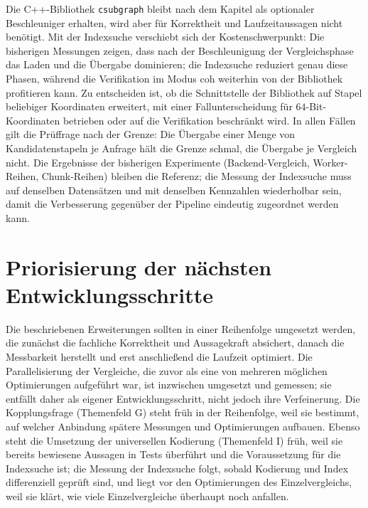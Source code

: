 \documentclass[a4paper,12pt, twoside]{report}
\theoremstyle{definition}
\begin{document}
Die C++-Bibliothek \texttt{csubgraph} bleibt nach dem Kapitel als optionaler Beschleuniger erhalten, wird aber für Korrektheit und Laufzeitaussagen nicht benötigt. Mit der Indexsuche verschiebt sich der Kostenschwerpunkt: Die bisherigen Messungen zeigen, dass nach der Beschleunigung der Vergleichsphase das Laden und die Übergabe dominieren; die Indexsuche reduziert genau diese Phasen, während die Verifikation im Modus coh weiterhin von der Bibliothek profitieren kann. Zu entscheiden ist, ob die Schnittstelle der Bibliothek auf Stapel beliebiger Koordinaten erweitert, mit einer Fallunterscheidung für $64$-Bit-Koordinaten betrieben oder auf die Verifikation beschränkt wird. In allen Fällen gilt die Prüffrage nach der Grenze: Die Übergabe einer Menge von Kandidatenstapeln je Anfrage hält die Grenze schmal, die Übergabe je Vergleich nicht. Die Ergebnisse der bisherigen Experimente (Backend-Vergleich, Worker-Reihen, Chunk-Reihen) bleiben die Referenz; die Messung der Indexsuche muss auf denselben Datensätzen und mit denselben Kennzahlen wiederholbar sein, damit die Verbesserung gegenüber der Pipeline eindeutig zugeordnet werden kann.

\section{Priorisierung der nächsten Entwicklungsschritte}
\label{sec:prio}

Die beschriebenen Erweiterungen sollten in einer Reihenfolge umgesetzt werden, die zunächst die fachliche Korrektheit und Aussagekraft absichert, danach die Messbarkeit herstellt und erst anschließend die Laufzeit optimiert. Die Parallelisierung der Vergleiche, die zuvor als eine von mehreren möglichen Optimierungen aufgeführt war, ist inzwischen umgesetzt und gemessen; sie entfällt daher als eigener Entwicklungsschritt, nicht jedoch ihre Verfeinerung. Die Kopplungsfrage (Themenfeld G) steht früh in der Reihenfolge, weil sie bestimmt, auf welcher Anbindung spätere Messungen und Optimierungen aufbauen. Ebenso steht die Umsetzung der universellen Kodierung (Themenfeld I) früh, weil sie bereits bewiesene Aussagen in Tests überführt und die Voraussetzung für die Indexsuche ist; die Messung der Indexsuche folgt, sobald Kodierung und Index differenziell geprüft sind, und liegt vor den Optimierungen des Einzelvergleichs, weil sie klärt, wie viele Einzelvergleiche überhaupt noch anfallen.
\end{document}
